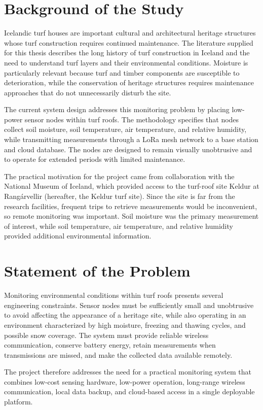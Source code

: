 \section{Background of the Study}
Icelandic turf houses are important cultural and architectural heritage structures whose turf construction requires continued maintenance. The literature supplied for this thesis describes the long history of turf construction in Iceland and the need to understand turf layers and their environmental conditions. Moisture is particularly relevant because turf and timber components are susceptible to deterioration, while the conservation of heritage structures requires maintenance approaches that do not unnecessarily disturb the site.

The current system design addresses this monitoring problem by placing low-power sensor nodes within turf roofs. The methodology specifies that nodes collect soil moisture, soil temperature, air temperature, and relative humidity, while transmitting measurements through a LoRa mesh network to a base station and cloud database. The nodes are designed to remain visually unobtrusive and to operate for extended periods with limited maintenance.

The practical motivation for the project came from collaboration with the National Museum of Iceland, which provided access to the turf-roof site Keldur at Rangárvellir (hereafter, the Keldur turf site). Since the site is far from the research facilities, frequent trips to retrieve measurements would be inconvenient, so remote monitoring was important. Soil moisture was the primary measurement of interest, while soil temperature, air temperature, and relative humidity provided additional environmental information.

\section{Statement of the Problem}
Monitoring environmental conditions within turf roofs presents several engineering constraints. Sensor nodes must be sufficiently small and unobtrusive to avoid affecting the appearance of a heritage site, while also operating in an environment characterized by high moisture, freezing and thawing cycles, and possible snow coverage. The system must provide reliable wireless communication, conserve battery energy, retain measurements when transmissions are missed, and make the collected data available remotely.

The project therefore addresses the need for a practical monitoring system that combines low-cost sensing hardware, low-power operation, long-range wireless communication, local data backup, and cloud-based access in a single deployable platform.

